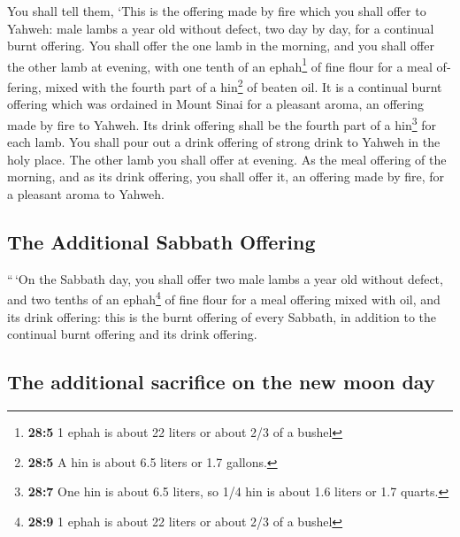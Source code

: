 \begin{paracol}{2}
\begin{otherlanguage}{english}
 You shall tell them, `This is the offering made by fire
which you shall offer to Yahweh: male lambs a year old without defect,
two day by day, for a continual burnt offering.  You shall
offer the one lamb in the morning, and you shall offer the other lamb at
evening,  with one tenth of an ephah\footnote{\textbf{28:5}
  1 ephah is about 22 liters or about 2/3 of a bushel} of fine flour for
a meal offering, mixed with the fourth part of a hin\footnote{\textbf{28:5}
  A hin is about 6.5 liters or 1.7 gallons.} of beaten oil.
 It is a continual burnt offering which was ordained in
Mount Sinai for a pleasant aroma, an offering made by fire to Yahweh.
 Its drink offering shall be the fourth part of a
hin\footnote{\textbf{28:7} One hin is about 6.5 liters, so 1/4 hin is
  about 1.6 liters or 1.7 quarts.} for each lamb. You shall pour out a
drink offering of strong drink to Yahweh in the holy place.
 The other lamb you shall offer at evening. As the meal
offering of the morning, and as its drink offering, you shall offer it,
an offering made by fire, for a pleasant aroma to Yahweh.

\hypertarget{the-additional-sabbath-offering}{%
\subsection{The Additional Sabbath
Offering}\label{the-additional-sabbath-offering}}

 ``\,`On the Sabbath day, you shall offer two male lambs a
year old without defect, and two tenths of an ephah\footnote{\textbf{28:9}
  1 ephah is about 22 liters or about 2/3 of a bushel} of fine flour for
a meal offering mixed with oil, and its drink offering: 
this is the burnt offering of every Sabbath, in addition to the
continual burnt offering and its drink offering.

\hypertarget{the-additional-sacrifice-on-the-new-moon-day}{%
\subsection{The additional sacrifice on the new moon
day}\label{the-additional-sacrifice-on-the-new-moon-day}}


\end{otherlanguage}
\end{paracol}
